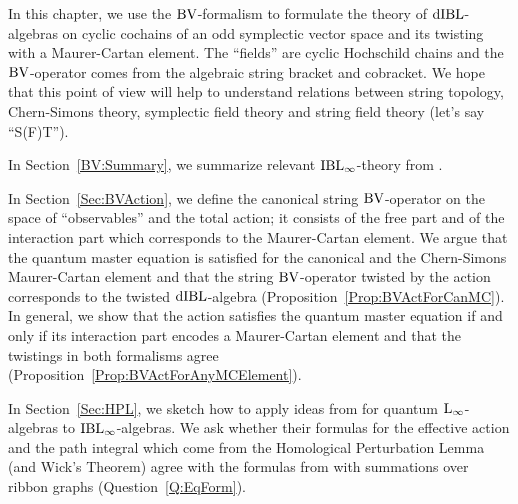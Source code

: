 \documentclass[\MainFolder/Text.tex]{subfiles}
\begin{document}
In this chapter, we use the $\mathrm{BV}$-formalism to formulate the theory of $\mathrm{dIBL}$-algebras on cyclic cochains of an odd symplectic vector space and its twisting with a Maurer-Cartan element.
The ``fields'' are cyclic Hochschild chains and the $\mathrm{BV}$-operator comes from the algebraic string bracket and cobracket.
We hope that this point of view will help to understand relations between string topology, Chern-Simons theory, symplectic field theory and string field theory (let's say ``S(F)T'').

In Section~\ref{BV:Summary}, we summarize relevant $\mathrm{IBL}_\infty$-theory from \cite{Cieliebak2015}.

In Section~\ref{Sec:BVAction}, we define the canonical string $\mathrm{BV}$-operator on the space of ``observables'' and the total action; it consists of the free part and of the interaction part which corresponds to the Maurer-Cartan element.
We argue that the quantum master equation is satisfied for the canonical and the Chern-Simons Maurer-Cartan element and that the string $\mathrm{BV}$-operator twisted by the action corresponds to the twisted $\mathrm{dIBL}$-algebra (Proposition~\ref{Prop:BVActForCanMC}).
In general, we show that the action satisfies the quantum master equation if and only if its interaction part encodes a Maurer-Cartan element and that the twistings in both formalisms agree (Proposition~\ref{Prop:BVActForAnyMCElement}).

In Section~\ref{Sec:HPL}, we sketch how to apply ideas from \cite{Doubek2018} for quantum $\mathrm{L}_\infty$-algebras to $\mathrm{IBL}_\infty$-algebras.
We ask whether their formulas for the effective action and the path integral which come from the Homological Perturbation Lemma (and Wick's Theorem) agree with the formulas from \cite{Cieliebak2015} with summations over ribbon graphs (Question~\ref{Q:EqForm}).
\end{document}
